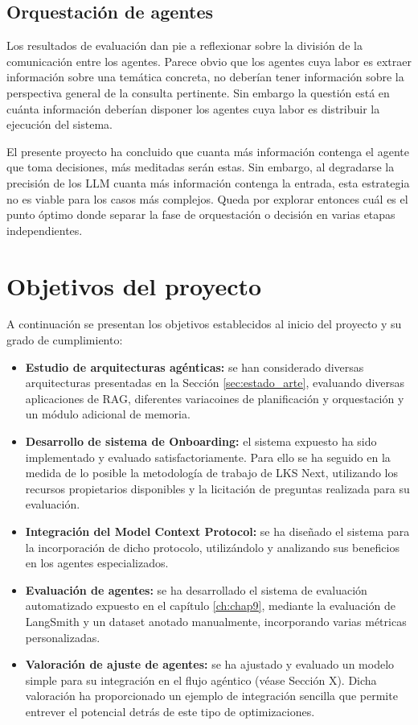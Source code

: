 \subsection{Orquestación de agentes}
\label{sec:conc}
Los resultados de evaluación dan pie a reflexionar sobre la división de la comunicación entre los agentes. Parece obvio que los agentes cuya labor es extraer información sobre una temática concreta, no deberían tener información sobre la perspectiva general de la consulta pertinente. Sin embargo la questión está en cuánta información deberían disponer los agentes cuya labor es distribuir la ejecución del sistema.

El presente proyecto ha concluido que cuanta más información contenga el agente que toma decisiones, más meditadas serán estas. Sin embargo, al degradarse la precisión de los LLM cuanta más información contenga la entrada, esta estrategia no es viable para los casos más complejos. Queda por explorar entonces cuál es el punto óptimo donde separar la fase de orquestación o decisión en varias etapas independientes. 

\section{Objetivos del proyecto}
A continuación se presentan los objetivos establecidos al inicio del proyecto y su grado de cumplimiento:
\begin{itemize}
  \item\textbf{Estudio de arquitecturas agénticas: }se han considerado diversas arquitecturas presentadas en la Sección \ref{sec:estado_arte}, evaluando diversas aplicaciones de RAG, diferentes variacoines de planificación y orquestación y un módulo adicional de memoria. 
  \item\textbf{Desarrollo de sistema de Onboarding: }el sistema expuesto ha sido implementado y evaluado satisfactoriamente. Para ello se ha seguido en la medida de lo posible la metodología de trabajo de LKS Next, utilizando los recursos propietarios disponibles y la licitación de preguntas realizada para su evaluación.
  \item\textbf{Integración del Model Context Protocol: }se ha diseñado el sistema para la incorporación de dicho protocolo, utilizándolo y analizando sus beneficios en los agentes especializados. 
  \item\textbf{Evaluación de agentes: }se ha desarrollado el sistema de evaluación automatizado expuesto en el capítulo \ref{ch:chap9}, mediante la evaluación de LangSmith y un dataset anotado manualmente, incorporando varias métricas personalizadas. 
  \item\textbf{Valoración de ajuste de agentes: }se ha ajustado y evaluado un modelo simple para su integración en el flujo agéntico (véase Sección X). Dicha valoración ha proporcionado un ejemplo de integración sencilla que permite entrever el potencial detrás de este tipo de optimizaciones.
\end{itemize}

